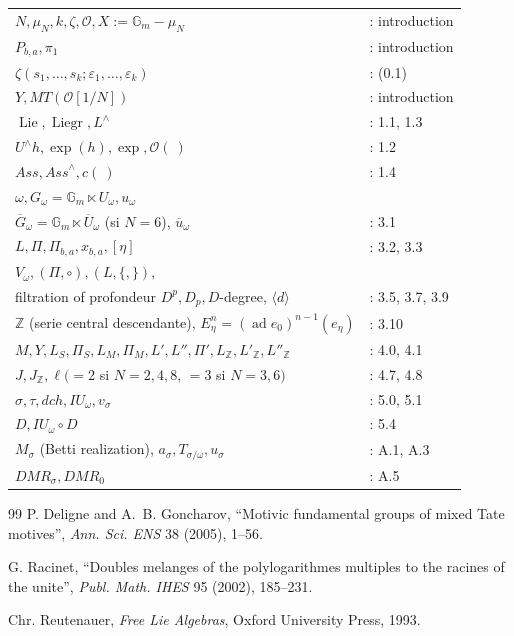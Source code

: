 \documentclass[11pt,a4paper]{article}
\theoremstyle{plain}
\theoremstyle{definition}
\DeclareMathOperator{\Lie}{Lie}
\DeclareMathOperator{\Liegr}{Liegr}
\DeclareMathOperator{\ad}{ad}
\newcommand{\Ass}{\textit{Ass}}
\newcommand{\DMR}{\mathit{DMR}}
\newcommand{\dch}{\mathit{dch}}
\newcommand{\Gm}{\mathbb{G}_m}
\newcommand{\Z}{\mathbb{Z}}
\begin{document}
\begin{tabular}{ll}
$N, \mu_N, k, \zeta, \mathcal{O}, X := \Gm - \mu_N$ &: introduction \\
$P_{b,a}, \pi_1$ &: introduction \\
$\zeta(s_1,\ldots,s_k; \varepsilon_1,\ldots,\varepsilon_k)$ &: (0.1) \\
$Y, MT(\mathcal{O}[1/N])$ &: introduction \\
$\Lie, \Liegr, L^{\wedge}$ &: 1.1, 1.3 \\
$U^{\wedge}h, \exp(h), \exp, \mathcal{O}(\ )$ &: 1.2 \\
$\Ass, \Ass^{\wedge}, c(\ )$ &: 1.4 \\
$\omega, G_\omega = \Gm \ltimes U_\omega, u_\omega$ & \\
\quad $\overline{G}_\omega = \Gm \ltimes \overline{U}_\omega$ (si $N=6$), $\overline{u}_\omega$ &: 3.1 \\
$L, \Pi, \Pi_{b,a}, x_{b,a}, [\eta]$ &: 3.2, 3.3 \\
$V_\omega, (\Pi, \circ), (L, \{,\}),$ & \\
\quad filtration of profondeur $D^p, D_p, D$-degree, $\langle d \rangle$ &: 3.5, 3.7, 3.9 \\
$\Z$ (serie central descendante), $E_\eta^n = (\ad e_0)^{n-1}(e_\eta)$ &: 3.10 \\
$M, Y, L_S, \Pi_S, L_M, \Pi_M, L', L'', \Pi', L_\Z, L'_\Z, L''_\Z$ &: 4.0, 4.1 \\
$J, J_\Z, \ell (=2$ si $N=2,4,8$, $=3$ si $N=3,6)$ &: 4.7, 4.8 \\
$\sigma, \tau, \dch, IU_\omega, v_\sigma$ &: 5.0, 5.1 \\
$D, IU_\omega \circ D$ &: 5.4 \\
$M_\sigma$ (Betti realization), $a_\sigma, T_{\sigma/\omega}, u_\sigma$ &: A.1, A.3 \\
$\DMR_\sigma, \DMR_0$ &: A.5
\end{tabular}

\begin{thebibliography}{99}
P. Deligne and A.~B. Goncharov, ``Motivic fundamental groups of mixed Tate motives'', \textit{Ann. Sci. ENS} 38 (2005), 1--56.

G. Racinet, ``Doubles melanges of the polylogarithmes multiples to the racines of the unite'', \textit{Publ. Math. IHES} 95 (2002), 185--231.

Chr. Reutenauer, \textit{Free Lie Algebras}, Oxford University Press, 1993.
\end{thebibliography}
\end{document}
